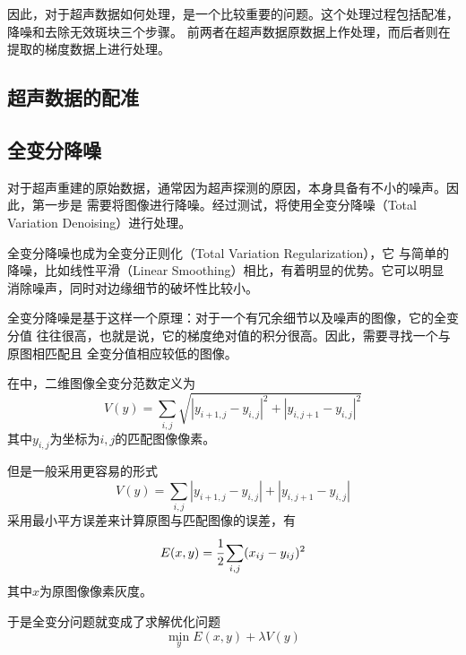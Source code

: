 因此，对于超声数据如何处理，是一个比较重要的问题。这个处理过程包括配准，降噪和去除无效斑块三个步骤。
前两者在超声数据原数据上作处理，而后者则在提取的梯度数据上进行处理。
\subsection{超声数据的配准}

\subsection{全变分降噪}
对于超声重建的原始数据，通常因为超声探测的原因，本身具备有不小的噪声。因此，第一步是
需要将图像进行降噪。经过测试，将使用全变分降噪（Total Variation Denoising）进行处理。

全变分降噪也成为全变分正则化（Total Variation Regularization），它
与简单的降噪，比如线性平滑（Linear Smoothing）相比，有着明显的优势。它可以明显
消除噪声，同时对边缘细节的破坏性比较小\cite{strong2003edge}。

全变分降噪是基于这样一个原理：对于一个有冗余细节以及噪声的图像，它的全变分值
往往很高，也就是说，它的梯度绝对值的积分很高。因此，需要寻找一个与原图相匹配且
全变分值相应较低的图像\cite{rudin1992nonlinear}。

在\cite{rudin1992nonlinear}中，二维图像全变分范数定义为
\begin{equation*}
V(y)=\sum_{i,j}\sqrt{|y_{i+1,j}-y_{i,j}|^2+|y_{i,j+1}-y_{i,j}|^2}
\end{equation*}
其中$y_{i,j}$为坐标为$i,j$的匹配图像像素。

但是一般采用更容易的形式
\begin{equation*}
V(y)=\sum_{i,j}|y_{i+1,j}-y_{i,j}|+|y_{i,j+1}-y_{i,j}|
\end{equation*}
采用最小平方误差来计算原图与匹配图像的误差，有
\begin{equation*}
E(x,y)=\cfrac{1}{2}\sum_{i,j}(x_{ij}-y_{ij})^2
\end{equation*}
其中$x$为原图像像素灰度。

于是全变分问题就变成了求解优化问题
\begin{equation*}
\min_yE(x,y)+\lambda V(y)
\end{equation*}

